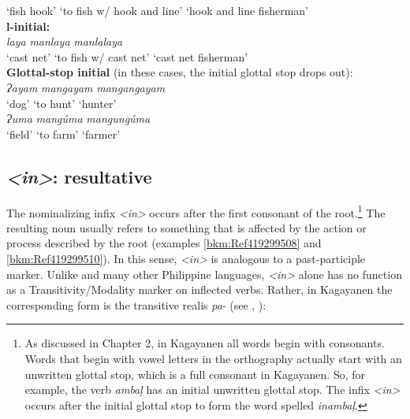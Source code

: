 \begin{tabbing}
‘fish hook’ \>  ‘to fish w/ hook and line’ \>  ‘hook and line fisherman’ \\
\textbf{l-initial:} \\
\textit{laya} \> \textit{manlaya} \> \textit{manlalaya} \\
‘cast net’ \>  ‘to fish w/ cast net’ \>    ‘cast net fisherman’ \\
\textbf{Glottal-stop initial} (in these cases, the initial glottal stop drops out): \\
\textit{Ɂayam} \> \textit{mangayam} \>\textit{ mangangayam} \\
‘dog’ \>  ‘to hunt’  \>   ‘hunter’ \\
\textit{Ɂuma} \> \textit{mangúma} \>   \textit{mangungúma} \\
‘field’ \>  ‘to farm’ \>  ‘farmer’
\end{tabbing}
\z

\subsection{\textit{<in>}: resultative}
\label{sec:in}
The nominalizing infix \textit{<in>} occurs after the first consonant of the root.\footnote{As discussed in Chapter 2, in Kagayanen all words begin with consonants. Words that begin with vowel letters in the orthography actually start with an unwritten glottal stop, which is a full consonant in Kagayanen. So, for example, the verb \textit{ambaļ} has an initial unwritten glottal stop. The infix \textit{<in>} occurs after the initial glottal stop to form the word spelled \textit{inambaļ}.} The resulting noun usually refers to something that is affected by the action or process described by the root (examples \ref{bkm:Ref419299508} and \ref{bkm:Ref419299510}). In this sense, \textit{<in>} is analogous to a past-participle marker. Unlike  and many other Philippine languages, \textit{<in>} alone has no function as a Transitivity/Modality marker on inflected verbs. Rather, in Kagayanen the corresponding  form is the transitive realis \textit{pa}{}- (see , ):

